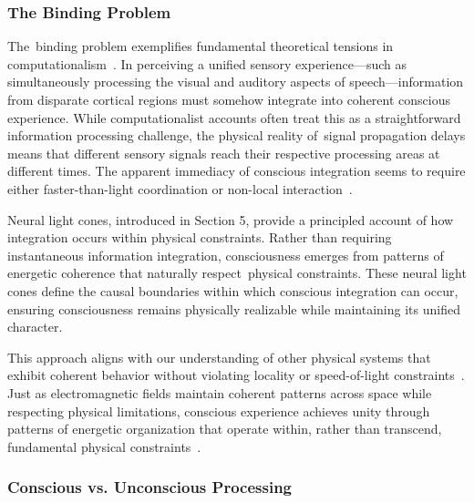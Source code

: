 \subsubsection{The Binding Problem}

The~binding problem exemplifies fundamental theoretical tensions in computationalism~\cite{varela1996neurophenomenology,gallagher2020phenomenological}. In perceiving a unified sensory experience—such as simultaneously processing the visual and auditory aspects of speech—information from disparate cortical regions must somehow integrate into coherent conscious experience. While computationalist accounts often treat this as a straightforward information processing challenge, the physical reality of~signal propagation delays means that different sensory signals reach their respective processing areas at different times. The apparent immediacy of conscious integration seems to require either faster-than-light coordination or non-local interaction~\cite{zheng2025unbearable,Beniaguev2021}.

Neural light cones, introduced in Section 5, provide a principled account of how integration occurs within physical constraints. Rather than requiring instantaneous information integration, consciousness emerges from patterns of energetic coherence that naturally respect~physical constraints. These neural light cones define the causal boundaries within which conscious integration can occur, ensuring consciousness remains physically realizable while maintaining its unified character.

This approach aligns with our understanding of other physical systems that exhibit coherent behavior without violating locality or speed-of-light constraints~\cite{prigogine2018order,levin2020revisiting}. Just as electromagnetic fields maintain coherent patterns across space while respecting physical limitations, conscious experience achieves unity through patterns of energetic organization that operate within, rather than transcend, fundamental physical constraints~\cite{hunt2024electromagnetic,McFadden2020}.

\subsubsection{Conscious vs. Unconscious Processing}

